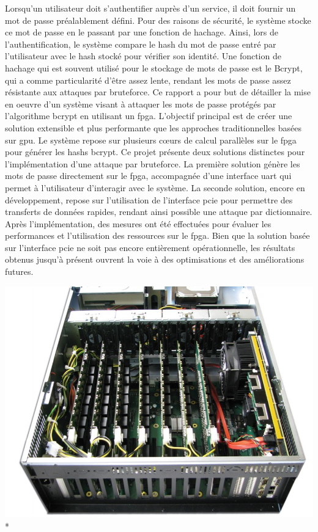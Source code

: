 \begin{spacing}{0.956}
\vspace{0.5cm}

Lorsqu'un utilisateur doit s'authentifier auprès d'un service, il doit fournir un mot de passe préalablement défini. 
Pour des raisons de sécurité, le système stocke ce mot de passe en le passant par une fonction de hachage. 
Ainsi, lors de l'authentification, le système compare le hash du mot de passe entré par l'utilisateur avec le hash stocké pour vérifier son identité. 
Une fonction de hachage qui est souvent utilisé pour le stockage de mots de passe est le Bcrypt, qui a comme particularité d'être assez lente, rendant les mots de passe assez résistante aux attaques par bruteforce. 
Ce rapport a pour but de détailler la mise en oeuvre d'un système visant à attaquer les mots de passe protégés par l'algorithme bcrypt en utilisant un \gls{fpga}. 
L'objectif principal est de créer une solution extensible et plus performante que les approches traditionnelles basées sur \gls{gpu}. 
Le système repose sur plusieurs cœurs de calcul parallèles sur le \gls{fpga} pour générer les hashs bcrypt. 
Ce projet présente deux solutions distinctes pour l'implémentation d'une attaque par bruteforce. 
La première solution génère les mots de passe directement sur le \gls{fpga}, accompagnée d'une interface \gls{uart} qui permet à l'utilisateur d'interagir avec le système. 
La seconde solution, encore en développement, repose sur l'utilisation de l'interface \gls{pcie} pour permettre des transferts de données rapides, rendant ainsi possible une attaque par dictionnaire. 
Après l'implémentation, des mesures ont été effectuées pour évaluer les performances et l'utilisation des ressources sur le \gls{fpga}. 
Bien que la solution basée sur l'interface \gls{pcie} ne soit pas encore entièrement opérationnelle, les résultats obtenus jusqu'à présent ouvrent la voie à des optimisations et des améliorations futures.

\vfill
\begin{center}
	{\includegraphics[width=0.4\linewidth]{figures/fpga_cluster}}\\*
\vfill


\end{center}
\end{spacing}
